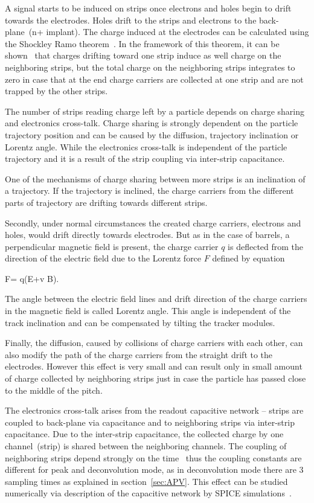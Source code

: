 A signal starts to be induced on strips once electrons and holes begin to drift towards the electrodes. Holes drift to the strips and electrons to the back-plane~(n+ implant). The charge induced at the electrodes can be calculated using the Shockley Ramo theorem~\cite{doi:10.1063/1.1710367,Ramo:1939vr}. In the framework of this theorem, it can be shown~\cite{Bloch:2007zza} that charges drifting toward one strip induce as well charge on the neighboring strips, but the total charge on the neighboring strips integrates to zero in case that at the end charge carriers are collected at one strip and are not trapped by the other strips.

The number of strips reading charge left by a particle depends on charge sharing and electronics cross-talk. Charge sharing is strongly dependent on the particle trajectory position and can be caused by the diffusion, trajectory inclination or Lorentz angle. While the electronics cross-talk is independent of the particle trajectory and it is a result of the strip coupling via inter-strip capacitance. 

One of the mechanisms of charge sharing between more strips is an inclination of a trajectory. If the trajectory is inclined, the charge carriers from the different parts of trajectory are drifting towards different strips.

Secondly, under normal circumstances the created charge carriers, electrons and holes, would drift directly towards electrodes. But as in the case of barrels, a perpendicular magnetic field is present, the charge carrier $q$ is deflected from the direction of the electric field due to the Lorentz force $F$ defined by equation

{
   F=  q(E+v \times B).
}

The angle between the electric field lines and drift direction of the charge carriers in the magnetic field is called Lorentz angle. This angle is independent of the track inclination and can be compensated by tilting the tracker modules.

Finally, the diffusion, caused by collisions of charge carriers with each other, can also modify the path of the charge carriers from the straight drift to the electrodes. However this effect is very small and can result only in small amount of charge collected by neighboring strips just in case the particle has passed close to the middle of the pitch.


The electronics cross-talk arises from the readout capacitive network -- strips are coupled to back-plane via capacitance and to neighboring strips via inter-strip capacitance. Due to the inter-strip capacitance, the collected charge by one channel~(strip) is shared between the neighboring channels. The coupling of neighboring strips depend strongly on the time~\cite{Bloch:2007zza} thus the coupling constants are different for peak and deconvolution mode, as in deconvolution mode there are 3 sampling times as explained in section~\ref{sec:APV}. This effect can be studied numerically via description of the capacitive network by SPICE simulations~\cite{Barberis:1993ph}.


